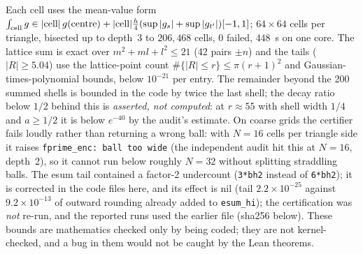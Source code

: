 \documentclass[10pt]{article}
\begin{document}
Each cell uses the mean-value form $\int_{\rm cell}g\in|{\rm cell}|\,g(\text{centre})+|{\rm cell}|\tfrac h4(\sup|g_s|+\sup|g_{t'}|)[-1,1]$; $64\times64$ cells per triangle, bisected up to depth~3 to $206{,}468$ cells, $0$ failed, $448$~s on one core. The lattice sum is exact over $m^2+ml+l^2\le21$ (42 pairs $\pm n$) and the tails ($|R|\ge5.04$) use the lattice-point count $\#\{|R|\le r\}\le\pi(r+1)^2$ and Gaussian-times-polynomial bounds, below $10^{-21}$ per entry. The remainder beyond the 200 summed shells is bounded in the code by twice the last shell; the decay ratio below $1/2$ behind this is \emph{asserted, not computed}: at $r\approx55$ with shell width $1/4$ and $a\ge1/2$ it is below $e^{-40}$ by the audit's estimate. On coarse grids the certifier fails loudly rather than returning a wrong ball: with $N=16$ cells per triangle side it raises \texttt{fprime\_enc: ball too wide} (the independent audit hit this at $N=16$, depth~2), so it cannot run below roughly $N=32$ without splitting straddling balls. The esum tail contained a factor-2 undercount (\texttt{3*bh2} instead of \texttt{6*bh2}); it is corrected in the code files here, and its effect is nil (tail $2.2\times10^{-25}$ against $9.2\times10^{-13}$ of outward rounding already added to \texttt{esum\_hi}); the certification was \emph{not} re-run, and the reported runs used the earlier file (sha256 below). These bounds are mathematics checked only by being coded; they are not kernel-checked, and a bug in them would not be caught by the Lean theorems.

\end{document}
